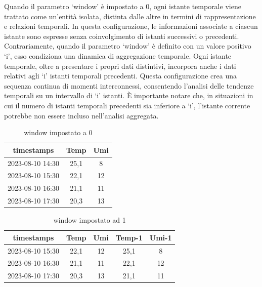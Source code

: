 \documentclass{rapportECL}
\begin{document}
Quando il parametro `window' è impostato a 0, ogni istante temporale viene trattato come un'entità isolata, distinta dalle altre in termini di 
rappresentazione e relazioni temporali. In questa configurazione, le informazioni associate a ciascun istante sono espresse senza coinvolgimento di 
istanti successivi o precedenti.
Contrariamente, quando il parametro `window' è definito con un valore positivo `i', esso condiziona una dinamica di aggregazione temporale. 
Ogni istante temporale, oltre a presentare i propri dati distintivi, incorpora anche i dati relativi agli `i' istanti temporali precedenti. 
Questa configurazione crea una sequenza continua di momenti interconnessi, consentendo l'analisi delle tendenze temporali su un intervallo di  `i' istanti. 
È importante notare che, in situazioni in cui il numero di istanti temporali precedenti sia inferiore a 
`i', l'istante corrente potrebbe non essere incluso nell'analisi aggregata.
\begin{table}[h]
  \centering
  \begin{tabular}{|c|c|c|}

    \hline
    timestamps & Temp & Umi\\
    \hline
    2023-08-10 14:30 & 25,1 & 8\\
    \hline
    2023-08-10 15:30 & 22,1 & 12\\
    \hline
    2023-08-10 16:30 & 21,1 & 11\\
    \hline
    2023-08-10 17:30 & 20,3 & 13\\
    \hline
  
  \end{tabular}
  
  \caption{window impostato a 0}
\end{table}


\begin{table}[h]
  \centering
  \begin{tabular}{|*{5}{c|}}
  
  \hline
  timestamps & Temp & Umi & Temp-1 & Umi-1\\
  \hline
  2023-08-10 15:30 & 22,1 & 12 & 25,1 & 8\\
  \hline
  2023-08-10 16:30 & 21,1 & 11 & 22,1 & 12\\
  \hline
  2023-08-10 17:30 & 20,3 & 13 & 21,1 & 11\\
  \hline
  
  \end{tabular}
  
  \caption{window impostato ad 1}
\end{table}
\end{document}
